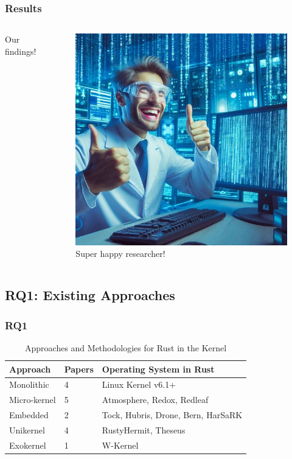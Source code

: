 \documentclass{beamer}
\begin{document}
\begin{frame}
  \frametitle{Results}
  \begin{columns}
    \begin{column}{0.5\textwidth}
      Our findings!
    \end{column}
    \begin{column}{0.5\textwidth}
      \begin{figure}
        \caption{Super happy researcher!\footnotemark[1]}
        \includegraphics[width=.8\textwidth]{images/results.jpeg}\footnotemark[1]
      \end{figure}
    \end{column}
  \end{columns}
\end{frame}

\subsection{RQ1: Existing Approaches}
\begin{frame}
  \frametitle{RQ1}
  \begin{table}
    \caption{Approaches and Methodologies for Rust in the Kernel}
    \begin{tabular}{||l|l|l||}
      \hline
      Approach & Papers & Operating System in Rust\\
      \hline\hline
      Monolithic   & 4 & Linux Kernel v6.1+\\
      Micro-kernel & 5 & Atmosphere, Redox, Redleaf\\
      Embedded     & 2 & Tock, Hubris, Drone, Bern, HarSaRK \\
      Unikernel & 4 & RustyHermit, Theseus \\
      Exokernel & 1 & W-Kernel \\
      \hline
    \end{tabular}
    \label{tab:RQ1}
  \end{table}

\end{frame}
\end{document}
